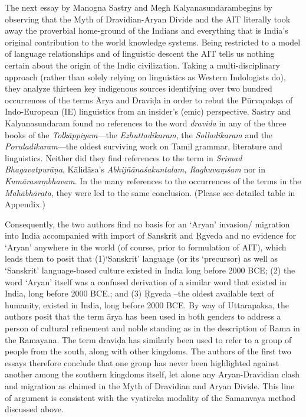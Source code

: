 The next essay by Manogna Sastry and Megh Kalyanasundaram\break begins by observing that the Myth of Dravidian-Aryan Divide and the AIT literally took away the proverbial home-ground of the Indians and everything that is India’s original contribution to the world knowledge systems. Being restricted to a model of language relationships and of linguistic descent the AIT tells us nothing certain about the origin of the Indic civilization. Taking a multi-disciplinary approach (rather than solely relying on linguistics as Western Indologists do), they analyze thirteen key indigenous sources identifying over two hundred occurrences of the terms Ārya and Draviḍa in order to rebut the Pūrvapakṣa of Indo-European (IE) linguistics from an insider’s (emic) perspective. Sastry and Kalyanasundaram found no references to the word \textit{dravida} in any of the three books of the \textit{Tolkāppiyam}—the \textit{Ezhuttadikaram}, the \textit{Solladikaram} and the \textit{Poruladikaram}—the oldest surviving work on Tamil grammar, literature and linguistics. Neither did they find references to the term in \textit{Srimad Bhagavatpurāṇa}, Kālidāsa’s \textit{Abhijñānaśakuntalam, Raghuvaṃśam} nor in \textit{Kumārasaṃbhavam}. In the many references to the occurrences of the terms in the \textit{Mahābhārata}, they were led to the same conclusion. (Please see detailed table in Appendix.)

Consequently, the two authors find no basis for an ‘Aryan’ invasion/ migration into India accompanied with import of Sanskrit and Ŗgveda and no evidence for ‘Aryan’ anywhere in the world (of course, prior to formulation of AIT), which leads them to posit that (1)‘Sanskrit’ language (or its ‘precursor) as well as ‘Sanskrit’ language-based culture existed in India long before 2000 BCE; (2) the word ‘Aryan’ itself was a confused derivation of a similar word that existed in India, long before 2000 BCE.; and (3) Ŗgveda –the oldest available text of humanity, existed in India, long before 2000 BCE. By way of Uttarapaksa, the authors posit that the term ārya has been used in both genders to address a person of cultural refinement and noble standing as in the description of Rama in the Ramayana. The term draviḍa has similarly been used to refer to a group of people from the south, along with other kingdoms. The authors of the first two essays therefore conclude that one group has never been highlighted against another among the southern kingdoms itself, let alone any Aryan-Dravidian clash and migration as claimed in the Myth of Dravidian and Aryan Divide. This line of argument is consistent with the vyatireka modality of the Samanvaya method discussed above.

